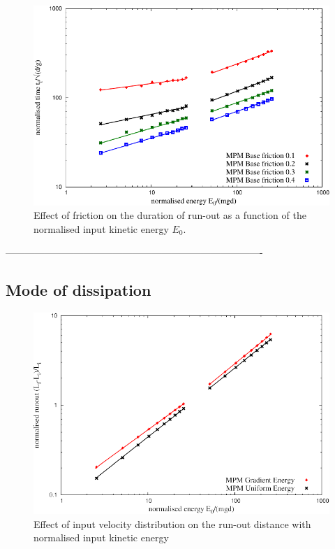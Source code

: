 \begin{figure}[tbhp]
\centering
\includegraphics[width=\textwidth]{time_fric_slope}
\caption{Effect of friction on the duration of run-out as a function of the 
normalised input kinetic energy $E_{0}$.}
\label{fig:time_fric_slope}
\end{figure}

-------------------------------------------------------------------------------

\subsection*{Mode of dissipation}

\begin{figure}[tbph]
\centering
\includegraphics[width=\textwidth]{Runout_Eo_GU}
\caption{Effect of input velocity distribution on the run-out distance with 
normalised input kinetic energy}
\label{fig:Runout_Eo_GU}
\end{figure}

